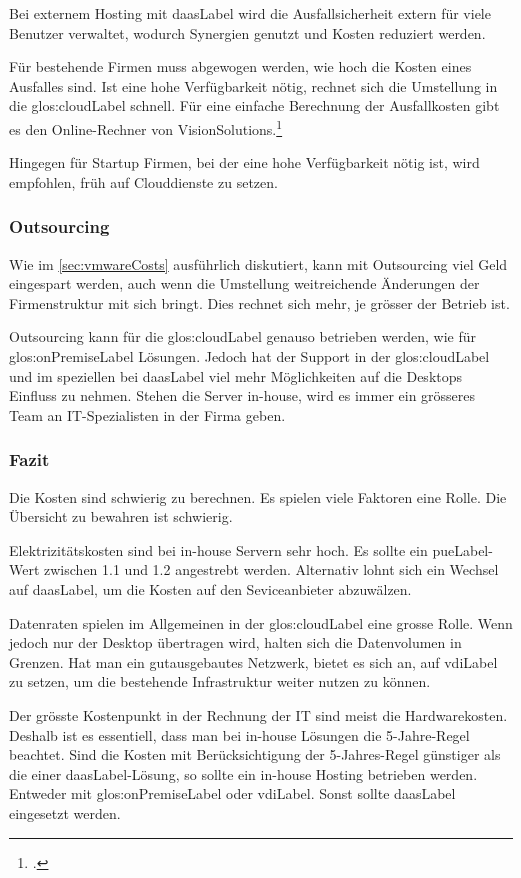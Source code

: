 Bei externem Hosting mit \Gls{daasLabel} wird die Ausfallsicherheit extern für viele Benutzer verwaltet, wodurch Synergien genutzt und Kosten reduziert werden.

Für bestehende Firmen muss abgewogen werden, wie hoch die Kosten eines Ausfalles sind. Ist eine hohe Verfügbarkeit nötig, rechnet sich die Umstellung in die \Gls{glos:cloudLabel} schnell. Für eine einfache Berechnung der Ausfallkosten gibt es den Online-Rechner von VisionSolutions.\footcite{Disaster_Recovery_Resouce_Center_-_Vision_Solutions}

Hingegen für Startup Firmen, bei der eine hohe Verfügbarkeit nötig ist, wird empfohlen, früh auf Clouddienste zu setzen.

\subsubsection{Outsourcing}
Wie im \cref{sec:vmwareCosts} ausführlich diskutiert, kann mit Outsourcing viel Geld eingespart werden, auch wenn die Umstellung weitreichende Änderungen der Firmenstruktur mit sich bringt. Dies rechnet sich mehr, je grösser der Betrieb ist.

Outsourcing kann für die \Gls{glos:cloudLabel} genauso betrieben werden, wie für \gls{glos:onPremiseLabel} Lösungen. Jedoch hat der Support in der \Gls{glos:cloudLabel} und im speziellen bei \Gls{daasLabel} viel mehr Möglichkeiten auf die Desktops Einfluss zu nehmen. Stehen die Server in-house, wird es immer ein grösseres Team an IT-Spezialisten in der Firma geben.

\subsubsection{Fazit}
Die Kosten sind schwierig zu berechnen. Es spielen viele Faktoren eine Rolle. Die Übersicht zu bewahren ist schwierig.

Elektrizitätskosten sind bei in-house Servern sehr hoch. Es sollte ein \Gls{pueLabel}-Wert zwischen 1.1 und 1.2 angestrebt werden. Alternativ lohnt sich ein Wechsel auf \Gls{daasLabel}, um die Kosten auf den Seviceanbieter abzuwälzen.

Datenraten spielen im Allgemeinen in der \Gls{glos:cloudLabel} eine grosse Rolle. Wenn jedoch nur der Desktop übertragen wird, halten sich die Datenvolumen in Grenzen. Hat man ein gutausgebautes Netzwerk, bietet es sich an, auf \Gls{vdiLabel} zu setzen, um die bestehende Infrastruktur weiter nutzen zu können.

Der grösste Kostenpunkt in der Rechnung der IT sind meist die Hardwarekosten. Deshalb ist es essentiell, dass man bei in-house Lösungen die 5-Jahre-Regel beachtet. Sind die Kosten mit Berücksichtigung der 5-Jahres-Regel günstiger als die einer \Gls{daasLabel}-Lösung, so sollte ein in-house Hosting betrieben werden. Entweder mit \gls{glos:onPremiseLabel} oder \Gls{vdiLabel}. Sonst sollte \Gls{daasLabel} eingesetzt werden.

